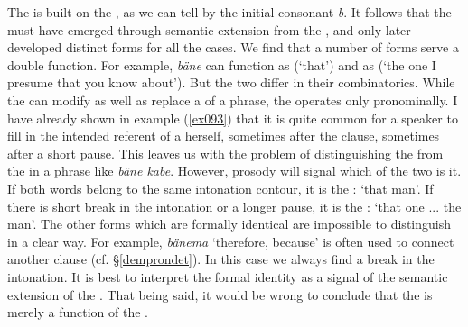 The   is built on the  , as we can tell by the initial consonant \emph{b}. It follows that the  must have emerged through semantic extension from the  , and only later developed distinct forms for all the cases. We find that a number of forms serve a double function. For example, \emph{bäne} can function as   (`that') and as   (`the one I presume that you know about'). But the two differ in their combinatorics. While the  can modify as well as replace a   of a phrase, the  operates only pronominally. I have already shown in example (\ref{ex093}) that it is quite common for a speaker to fill in the intended referent of a  herself, sometimes after the clause, sometimes after a short pause. This leaves us with the problem of distinguishing the   from the  in a phrase like \emph{bäne kabe}. However, prosody will signal which of the two is it. If both words belong to the same intonation contour, it is the  : `that man'. If there is short break in the intonation or a longer pause, it is the : `that one ... the man'. The other  forms which are formally identical are impossible to distinguish in a clear way. For example, \emph{bänema} `therefore, because' is often used to connect another clause (cf. \S{}\ref{demprondet}). In this case we always find a break in the intonation. It is best to interpret the formal identity as a signal of the semantic extension of the  . That being said, it would be wrong to conclude that the  is merely a function of the  .

